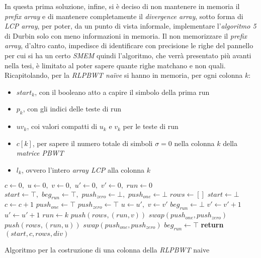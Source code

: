 In questa prima soluzione, infine, si è deciso di non mantenere in memoria il
\textit{prefix array} e di mantenere completamente il \textit{divergence
  array}, sotto forma di \textit{LCP array}, per poter, da un punto di vista
informale, implementare l'\textit{algoritmo 
5} di Durbin solo con meno informazioni in memoria. Il non memorizzare il
\textit{prefix array}, d'altro canto, impedisce di identificare con precisione
le righe del pannello per cui si ha un certo \textit{SMEM} quindi l'algoritmo,
che verrà 
presentato più avanti nella tesi, è limitato al poter sapere quante righe
matchano e non quali.\\
Ricapitolando, per la \textit{RLPBWT na\"{i}ve} si hanno in memoria, per ogni
colonna $k$:
\begin{itemize}
  \item $start_k$, con il booleano atto a capire il simbolo della prima run
  \item $p_k$, con gli indici delle teste di run
  \item $uv_k$, coi valori compatti di $u_k$ e $v_k$ per le teste di run
  \item $c[k]$, per sapere il numero totale di simboli $\sigma=0$ nella colonna
  $k$ della \textit{matrice PBWT}
  \item $l_k$, ovvero l'intero \textit{array LCP} alla colonna $k$
\end{itemize}
\begin{algorithm}
  \small
  \begin{algorithmic}[1]
    \State $c\gets 0,\,\,u\gets 0,\,\,v\gets 0,\,\,u'\gets 0,\,\, v'\gets
    0,\,\,run\gets 0$
    \State $start \gets \top,\,\,beg_{run}\gets \top,\,\,push_{zero}\gets
    \bot,\,\,push_{one}\gets \bot$
    \State $rows\gets []$
    \For {\textit{every} $k\in\left[0,\,\, M\right)$}
    \State $start \gets \bot$
    \EndIf
    \State $c\gets c+1$
    \EndIf
    \EndFor
    \State $push_{one}\gets \top$
    \Else
    \State $push_{zero}\gets \top$
    \EndIf
    \For{\textit{every} $k\in[0,M)$}
    \State $u\gets u',\,\,v\gets v'$
    \State $beg_{run}\gets \bot$
    \EndIf
    \State $v'\gets v'+1$
    \Else
    \State $u'\gets u'+1$
    \EndIf
    \State $run\gets k$
    \EndIf
    \State $push(rows, (run, v))$
    \State $swap(push_{one}, push_{zero})$
    \Else
    \State $push(rows, (run, u))$
    \State $swap(push_{one}, push_{zero})$
    \EndIf
    \State $beg_{run}\gets \top$
    \EndIf
    \EndFor
    \State \textbf{return} $(start, c, rows, div)$
    \EndFunction
  \end{algorithmic}
  \caption{\footnotesize{Algoritmo per la costruzione di una colonna della
  \textit{RLPBWT} naive}}
  \label{algo:buildnaive}
\end{algorithm}
